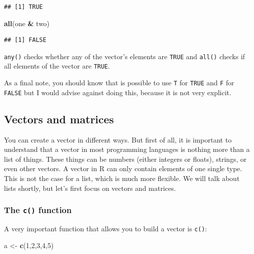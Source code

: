\documentclass[]{gitbook}
\newenvironment{Shaded}{\begin{snugshade}}{\end{snugshade}}
\newcommand{\DecValTok}[1]{\textcolor[rgb]{0.00,0.00,0.81}{#1}}
\newcommand{\KeywordTok}[1]{\textcolor[rgb]{0.13,0.29,0.53}{\textbf{#1}}}
\newcommand{\NormalTok}[1]{#1}
\newcommand{\OperatorTok}[1]{\textcolor[rgb]{0.81,0.36,0.00}{\textbf{#1}}}
\newcommand{\StringTok}[1]{\textcolor[rgb]{0.31,0.60,0.02}{#1}}
\begin{document}
\begin{verbatim}
## [1] TRUE
\end{verbatim}

\begin{Shaded}
\begin{Highlighting}[]
\KeywordTok{all}\NormalTok{(one }\OperatorTok{&}\StringTok{ }\NormalTok{two)}
\end{Highlighting}
\end{Shaded}

\begin{verbatim}
## [1] FALSE
\end{verbatim}

\texttt{any()} checks whether any of the vector's elements are \texttt{TRUE} and \texttt{all()} checks if all elements of the vector are
\texttt{TRUE}.

As a final note, you should know that is possible to use \texttt{T} for \texttt{TRUE} and \texttt{F} for \texttt{FALSE} but I would advise against
doing this, because it is not very explicit.

\hypertarget{vectors-and-matrices}{%
\subsection{Vectors and matrices}\label{vectors-and-matrices}}

You can create a vector in different ways. But first of all, it is important to understand that a
vector in most programming languages is nothing more than a list of things. These things can be
numbers (either integers or floats), strings, or even other vectors. A vector in R can only contain elements of one
single type. This is not the case for a list, which is much more flexible. We will talk about lists shortly, but
let's first focus on vectors and matrices.

\hypertarget{the-c-function}{%
\subsubsection{\texorpdfstring{The \texttt{c()} function}{The c() function}}\label{the-c-function}}

A very important function that allows you to build a vector is \texttt{c()}:

\begin{Shaded}
\begin{Highlighting}[]
\NormalTok{a <-}\StringTok{ }\KeywordTok{c}\NormalTok{(}\DecValTok{1}\NormalTok{,}\DecValTok{2}\NormalTok{,}\DecValTok{3}\NormalTok{,}\DecValTok{4}\NormalTok{,}\DecValTok{5}\NormalTok{)}
\end{Highlighting}
\end{Shaded}
\end{document}
